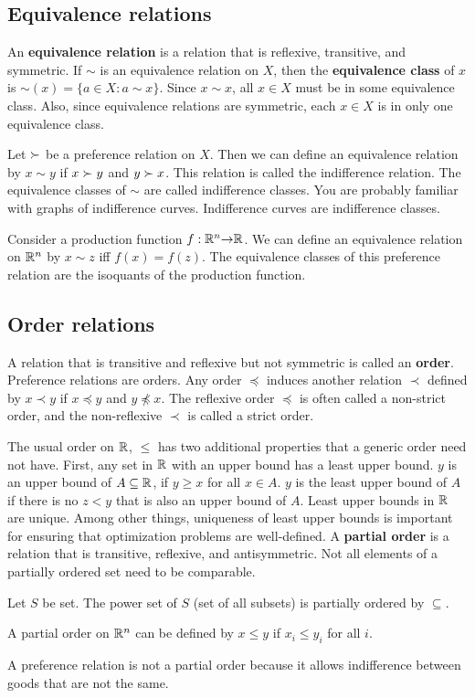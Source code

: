 \subsection{Equivalence relations}
An \textbf{equivalence relation} is a relation that is reflexive,
transitive, and symmetric. If $\sim$ is an equivalence relation on
$X$, then the \textbf{equivalence class} of $x$ is $\sim(x) = \{ a
\in X: a \sim x \}$. Since $x \sim x$, all $x
\in X$ must be in some equivalence class. Also, since equivalence
relations are symmetric, each $x \in X$ is in only one equivalence
class. 
\begin{example}[Indifference]
  Let $\succ$ be a preference relation on $X$. Then we can define an
  equivalence relation by $x \sim y$ if $x \succ y$ and $y \succ
  x$. This relation is called the indifference relation. The
  equivalence classes of $\sim$ are called indifference classes. You
  are probably familiar with graphs of indifference
  curves. Indifference curves are indifference classes. 
\end{example}
\begin{example}[Isoquants]
  Consider a production function $f: \mathbb{R}^n {\rightarrow} \mathbb{R}$. We can define an
  equivalence relation on $\mathbb{R}^n$ by $x \sim z$ iff $f(x) = f(z)$. The
  equivalence classes of this preference relation are the isoquants of
  the production function. 
\end{example}

\subsection{Order relations}
A relation that is transitive and reflexive but not symmetric is
called an \textbf{order}. Preference relations are orders. Any order
$\preceq$ induces another relation $\prec$ defined by $x \prec y$ if
$x \preceq y$ and $y \npreceq x$. The reflexive order $\preceq$ is
often called a non-strict order, and the non-reflexive $\prec$
is called a strict order.

The usual order on $\mathbb{R}$, $\leq$ has two additional properties that a
generic order need not have. First, any set in $\mathbb{R}$ with an upper
bound has a least upper bound. $y$ is an upper bound of $ A \subseteq
\mathbb{R}$, if $y \geq x$ for all $x \in A$. $y$ is the least upper bound of
$A$ if there is no $z < y$ that is also an upper bound of $A$. Least
upper bounds in $\mathbb{R}$ are unique. Among other things, uniqueness of
least upper bounds is important for ensuring that optimization
problems are well-defined. A \textbf{partial order} is a relation that
is transitive, reflexive, and antisymmetric. Not all elements of a
partially ordered set need to be comparable.  
\begin{example}
  Let $S$ be set. The power set of $S$ (set of all subsets) is
  partially ordered by $\subseteq$.
\end{example}
\begin{example}
  A partial order on $\mathbb{R}^n$ can be defined by $x \leq y$ if $x_i \leq
  y_i$ for all $i$.
\end{example}
A preference relation is not a partial order because it allows
indifference between goods that are not the same. 


